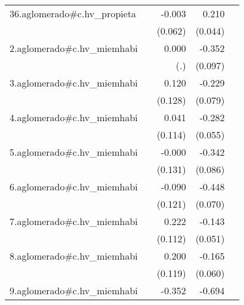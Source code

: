 {\begin{longtable}{l*{4}{D{.}{.}{-1}}}
\addlinespace
36.aglomerado#c.hv\_propieta&                     &      -0.003         &       0.210\sym{***}&                     \\
            &                     &     (0.062)         &     (0.044)         &                     \\
\addlinespace
2.aglomerado#c.hv\_miemhabi&                     &       0.000         &      -0.352\sym{***}&                     \\
            &                     &         (.)         &     (0.097)         &                     \\
\addlinespace
3.aglomerado#c.hv\_miemhabi&                     &       0.120         &      -0.229\sym{**} &                     \\
            &                     &     (0.128)         &     (0.079)         &                     \\
\addlinespace
4.aglomerado#c.hv\_miemhabi&                     &       0.041         &      -0.282\sym{***}&                     \\
            &                     &     (0.114)         &     (0.055)         &                     \\
\addlinespace
5.aglomerado#c.hv\_miemhabi&                     &      -0.000         &      -0.342\sym{***}&                     \\
            &                     &     (0.131)         &     (0.086)         &                     \\
\addlinespace
6.aglomerado#c.hv\_miemhabi&                     &      -0.090         &      -0.448\sym{***}&                     \\
            &                     &     (0.121)         &     (0.070)         &                     \\
\addlinespace
7.aglomerado#c.hv\_miemhabi&                     &       0.222\sym{*}  &      -0.143\sym{**} &                     \\
            &                     &     (0.112)         &     (0.051)         &                     \\
\addlinespace
8.aglomerado#c.hv\_miemhabi&                     &       0.200         &      -0.165\sym{**} &                     \\
            &                     &     (0.119)         &     (0.060)         &                     \\
\addlinespace
9.aglomerado#c.hv\_miemhabi&                     &      -0.352\sym{**} &      -0.694\sym{***}&                     \\

\end{longtable}}
